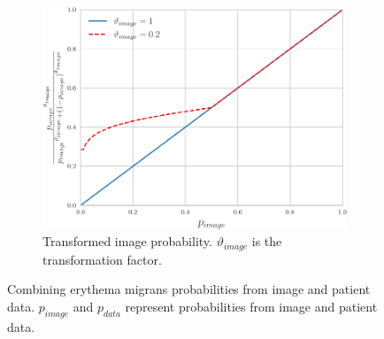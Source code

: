 \begin{figure}[t!]
	\begin{subfigure}[b]{0.75\textwidth}
		\centering
		\includegraphics[width=\textwidth,keepaspectratio]{images/elicitation/less_extreme_image-cropped.pdf}
		\caption{Transformed image probability. $\vartheta_{image}$ is the transformation factor.}
		\label{fig:less_extreme_image}
	\end{subfigure}
	\caption[Combining erythema migrans probabilities from image and patient data]{Combining erythema migrans probabilities from image and patient data. $p_{image}$ and $p_{data}$ represent probabilities from image and patient data.}
	\label{fig:gmean_combination}
\end{figure}


